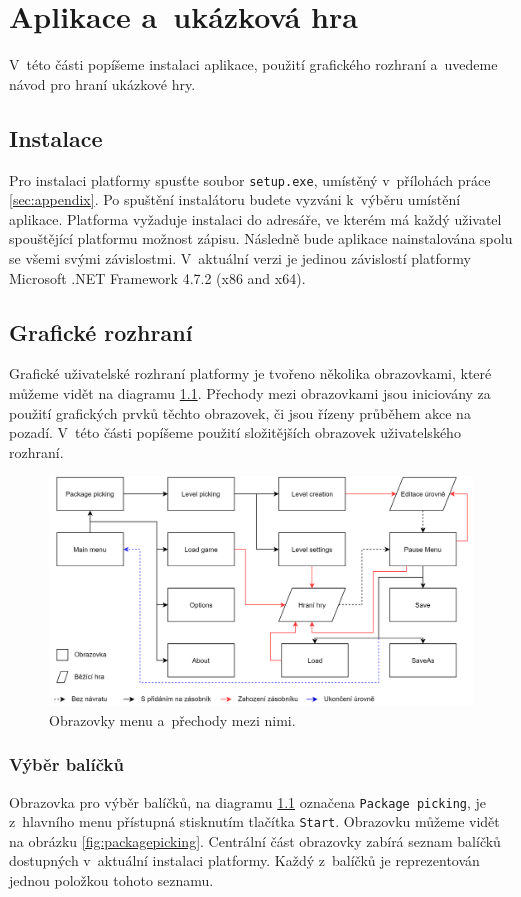 \chapter{Aplikace a~ukázková hra}
V~této části popíšeme instalaci aplikace, použití grafického rozhraní a~uvedeme návod pro hraní ukázkové hry. 

\section{Instalace}
Pro instalaci platformy spusťte soubor \texttt{setup.exe}, umístěný v~přílohách práce \ref{sec:appendix}. Po spuštění instalátoru budete vyzváni k~výběru umístění aplikace. Platforma vyžaduje instalaci do adresáře, ve kterém má každý uživatel spouštějící platformu možnost zápisu. Následně bude aplikace nainstalována spolu se všemi svými závislostmi. V~aktuální verzi je jedinou závislostí platformy Microsoft .NET Framework 4.7.2 (x86 and x64).

\section{Grafické rozhraní}
Grafické uživatelské rozhraní platformy je tvořeno několika obrazovkami, které můžeme vidět na diagramu \ref{fig:screen_structure2}. Přechody mezi obrazovkami jsou iniciovány za použití grafických prvků těchto obrazovek, či jsou řízeny průběhem akce na pozadí. V~této části popíšeme použití složitějších obrazovek uživatelského rozhraní.

\begin{figure}[h]
	\centering
	\includegraphics[width=\textwidth]{img/ScreenStructure.png}
	\caption{Obrazovky menu a~přechody mezi nimi.}
	\label{fig:screen_structure2}
\end{figure}

\subsection{Výběr balíčků}
Obrazovka pro výběr balíčků, na diagramu \ref{fig:screen_structure2} označena \texttt{Package picking}, je z~hlavního menu přístupná stisknutím tlačítka \texttt{Start}. Obrazovku můžeme vidět na obrázku \ref{fig:packagepicking}. Centrální část obrazovky zabírá seznam balíčků dostupných v~aktuální instalaci platformy. Každý z~balíčků je reprezentován jednou položkou tohoto seznamu. 

